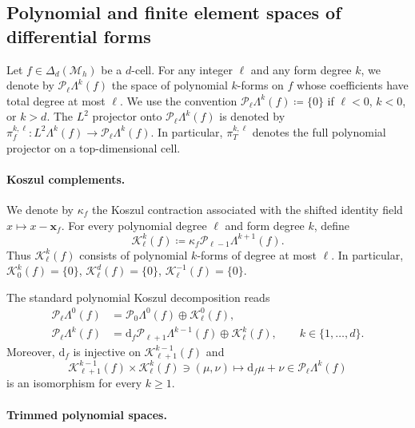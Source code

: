 \documentclass[a4paper,11pt]{article}
\theoremstyle{definition}
\newcommand{\DIFF}{\mathrm{d}}
\newcommand{\KOSZUL}{\kappa}
\newcommand{\Mh}{\mathcal{M}_h}
\newcommand{\FM}[1]{\Delta_{#1}}
\newcommand{\PL}[2]{\mathcal{P}_{#1}\Lambda^{#2}}
\begin{document}
\subsection{Polynomial and finite element spaces of differential forms}
\label{sec:setting:polynomial-forms}

Let $f\in\FM{d}(\Mh)$ be a $d$-cell.
For any integer $\ell$ and any form degree $k$, we denote by $\PL{\ell}{k}(f)$ the space of polynomial $k$-forms on $f$ whose coefficients have total degree at most $\ell$.
We use the convention $\PL{\ell}{k}(f)\coloneqq\{0\}$ if $\ell<0$, $k<0$, or $k>d$.
The $L^2$ projector onto $\PL{\ell}{k}(f)$ is denoted by $\pi_f^{k,\ell}\colon L^2\Lambda^k(f)\longrightarrow\PL{\ell}{k}(f)$.
In particular, $\pi_T^{k,\ell}$ denotes the full polynomial projector on a top-dimensional cell.

\paragraph{Koszul complements.}

We denote by $\KOSZUL_f$ the Koszul contraction associated with the shifted identity field $x\mapsto x-\boldsymbol{x}_f$.
For every polynomial degree $\ell$ and form degree $k$, define
\[
  \mathcal K_\ell^k(f)
  \coloneqq
  \KOSZUL_f\PL{\ell-1}{k+1}(f).
\]
Thus $\mathcal K_\ell^k(f)$ consists of polynomial $k$-forms of degree at most $\ell$.
In particular, $\mathcal K_0^k(f)=\{0\}$, $\mathcal K_\ell^d(f)=\{0\}$, $\mathcal K_\ell^{-1}(f)=\{0\}$.

The standard polynomial Koszul decomposition reads
\begin{subequations}\label{eq:full-polynomial-koszul-decomposition}
\begin{align}
  \PL{\ell}{0}(f)
  &=
  \PL{0}{0}(f)
  \oplus
  \mathcal K_\ell^0(f),
  \label{eq:full-polynomial-koszul-decomposition-zero}
  \\
  \PL{\ell}{k}(f)
  &=
  \DIFF_f\PL{\ell+1}{k-1}(f)
  \oplus
  \mathcal K_\ell^k(f),
  \qquad
  k\in\{1,\ldots,d\}.
  \label{eq:full-polynomial-koszul-decomposition-positive}
\end{align}
\end{subequations}
Moreover, $\DIFF_f$ is injective on $\mathcal K_{\ell+1}^{k-1}(f)$ and
\[
  \mathcal K_{\ell+1}^{k-1}(f)
  \times
  \mathcal K_\ell^k(f)
  \ni
  (\mu,\nu)
  \longmapsto
  \DIFF_f\mu+\nu
  \in
  \PL{\ell}{k}(f)
\]
is an isomorphism for every $k\geq1$.

\paragraph{Trimmed polynomial spaces.}
\end{document}
